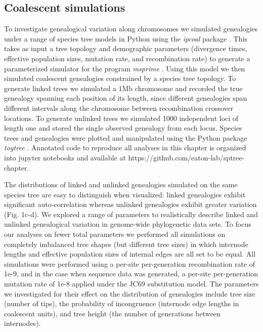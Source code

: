 \documentclass[11pt]{article}
\begin{document}


\subsection{Coalescent simulations}
To investigate genealogical variation along chromosomes we simulated genealogies under a range of species tree models in Python using the \emph{ipcoal} package \citep{mckenzie_ipcoal_2020}. This takes as input a tree topology and demographic parameters (divergence times, effective population sizes, mutation rate, and recombination rate) to generate a parameterized simulator for the program \emph{msprime} \citep{kelleher_efficient_2016}. Using this model we then simulated coalescent genealogies constrained by a species tree topology. To generate linked trees we simulated a 1Mb chromosome and recorded the true genealogy spanning each position of its length, since different genealogies span different intervals along the chromosome between recombination crossover locations. To generate unlinked trees we simulated 1000 independent loci of length one and stored the single observed genealogy from each locus. Species trees and genealogies were plotted and manipulated using the Python package \emph{toytree} \citep{eaton_toytree_2020}. Annotated code to reproduce all analyses in this chapter is organized into jupyter notebooks and available at https://github.com/eaton-lab/sptree-chapter.

The distributions of linked and unlinked genealogies simulated on the same species tree are easy to distinguish when visualized: linked genealogies exhibit significant auto-correlation whereas unlinked genealogies exhibit greater variation (Fig. 1c-d). We explored a range of parameters to realistically describe linked and unlinked genealogical variation in genome-wide phylogenetic data sets. To focus our analyses on fewer total parameters we performed all simulations on completely imbalanced tree shapes (but different tree sizes) in which internode lengths and effective population sizes of internal edges are all set to be equal. All simulations were performed using a per-site per-generation recombination rate of 1e-9, and in the case when sequence data was generated, a per-site per-generation mutation rate of 1e-8 applied under the JC69 substitution model. The parameters we investigated for their effect on the distribution of genealogies include tree size (number of tips), the probability of incongruence (internode edge lengths in coalescent units), and tree height (the number of generations between internodes). 
\end{document}
